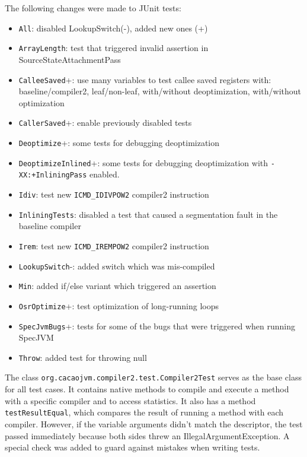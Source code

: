 \documentclass[draft,final]{vutinfth} %
\begin{document}
    The following changes were made to JUnit tests:
    \begin{itemize}
        \item \lstinline{All}: disabled LookupSwitch(-), added new ones (+)
        \item \lstinline{ArrayLength}: test that triggered invalid assertion in SourceStateAttachmentPass
        \item \lstinline{CalleeSaved}+: use many variables to test callee saved registers with: baseline/compiler2, leaf/non-leaf, with/without deoptimization, with/without optimization
        \item \lstinline{CallerSaved}+: enable previously disabled tests
        \item \lstinline{Deoptimize}+: some tests for debugging deoptimization
        \item \lstinline{DeoptimizeInlined}+: some tests for debugging deoptimization with \lstinline{-XX:+InliningPass} enabled.
        \item \lstinline{Idiv}: test new \lstinline{ICMD_IDIVPOW2} compiler2 instruction
        \item \lstinline{InliningTests}: disabled a test that caused a segmentation fault in the baseline compiler
        \item \lstinline{Irem}: test new \lstinline{ICMD_IREMPOW2} compiler2 instruction
        \item \lstinline{LookupSwitch}-: added switch which was mis-compiled
        \item \lstinline{Min}: added if/else variant which triggered an assertion
        \item \lstinline{OsrOptimize}+: test optimization of long-running loops
        \item \lstinline{SpecJvmBugs}+: tests for some of the bugs that were triggered when running SpecJVM
        \item \lstinline{Throw}: added test for throwing null
    \end{itemize}

    The class \lstinline{org.cacaojvm.compiler2.test.Compiler2Test} serves as the base class for all test cases.
    It contains native methods to compile and execute a method with a specific compiler and to access statistics.
    It also has a method \lstinline{testResultEqual},
    which compares the result of running a method with each compiler.
    However, if the variable arguments didn't match the descriptor,
    the test passed immediately because both sides threw an IllegalArgumentException.
    A special check was added to guard against mistakes when writing tests.
\end{document}
